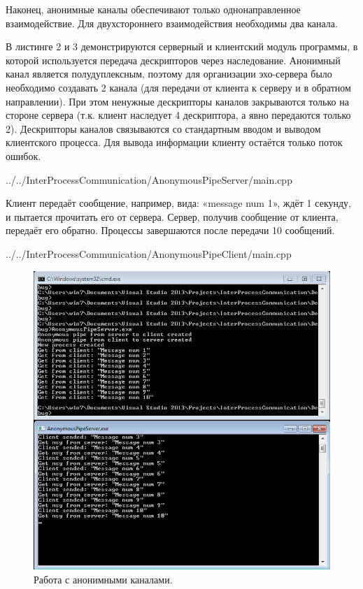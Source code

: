 \documentclass[a4paper, 12pt]{report}		%
\begin{document}
Наконец, анонимные каналы обеспечивают только однонаправленное взаимодействие. Для двухстороннего взаимодействия необходимы два канала.

В листинге 2 и 3 демонстрируются серверный и клиентский модуль программы, в которой используется передача дескрипторов через наследование. Анонимный канал является полудуплексным, поэтому для организации эхо-сервера было необходимо создавать 2 канала (для передачи от клиента к серверу и в обратном направлении). При этом ненужные дескрипторы каналов закрываются только на стороне сервера (т.к. клиент наследует 4 дескриптора, а явно передаются только 2). Дескрипторы каналов связываются со стандартным вводом и выводом клиентского процесса. Для вывода информации клиенту остаётся только поток ошибок.


{../../InterProcessCommunication/AnonymousPipeServer/main.cpp}

Клиент передаёт сообщение, например, вида: «message num 1», ждёт 1 секунду, и пытается прочитать его от сервера. Сервер, получив сообщение от клиента, передаёт его обратно. Процессы завершаются после передачи 10 сообщений.


{../../InterProcessCommunication/AnonymousPipeClient/main.cpp}

\begin{figure}[h!]
\centering
\includegraphics[scale=0.95]{res/02_anonymous_channels}
\caption{Работа с анонимными каналами.}
\end{figure}
\end{document}
